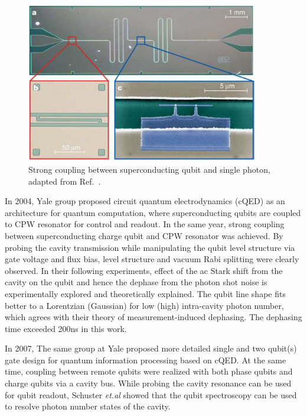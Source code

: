 \documentclass[%
groupedaddress,
showpacs,
 amsmath,amssymb,
 aps,
prb,
]{revtex4-1}
\newcommand{\etal}{\textit{et.al}}
\begin{document}
            \begin{figure}[h]
                \centering
                \includegraphics[width=4in]{review/strongCoupling2004.png}
                \caption{Strong coupling between superconducting qubit and single photon, adapted from Ref.~.}
                \label{fig:strongCoupling2004}
            \end{figure}

In 2004, Yale group proposed circuit quantum electrodynamics (cQED) as an architecture for quantum computation, where superconducting qubits are coupled to CPW resonator for control and readout\cite{Blais2004}. In the same year, strong coupling between superconducting charge qubit and CPW resonator was achieved\cite{Wallraff2004Nature}. By probing the cavity transmission while manipulating the qubit level structure via gate voltage and flux bias, level structure and vacuum Rabi splitting were clearly observed. In their following experiments, effect of the ac Stark shift from the cavity on the qubit and hence the dephase from the photon shot noise is experimentally explored\cite{Schuster2005} and theoretically explained\cite{Gambetta2006}. The qubit line shape fits better to a Lorentzian (Gaussian) for low (high) intra-cavity photon number, which agrees with their theory of measurement-induced dephasing. The dephasing time exceeded 200ns in this work.


In 2007, The same group at Yale proposed more detailed single and two qubit(s) gate design for quantum information processing based on cQED\cite{Blais2007}. At the same time, coupling between remote qubits were realized with both phase qubits\cite{Sillanpaa2007} and charge qubits\cite{Majer2007} via a cavity bus. While probing the cavity resonance can be used for qubit readout, Schuster \etal{} showed that the qubit spectroscopy can be used to resolve photon number states of the cavity\cite{Schuster2007Resolving}.
\end{document}
